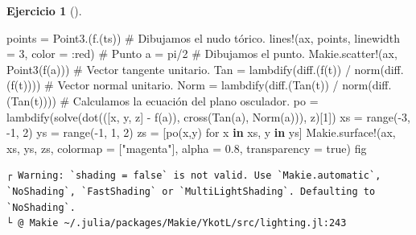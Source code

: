 \documentclass[
  a4paper,
]{scrreport}
\newenvironment{Shaded}{\begin{snugshade}}{\end{snugshade}}
\newcommand{\CommentTok}[1]{\textcolor[rgb]{0.37,0.37,0.37}{#1}}
\newcommand{\ConstantTok}[1]{\textcolor[rgb]{0.56,0.35,0.01}{#1}}
\newcommand{\FloatTok}[1]{\textcolor[rgb]{0.68,0.00,0.00}{#1}}
\newcommand{\FunctionTok}[1]{\textcolor[rgb]{0.28,0.35,0.67}{#1}}
\newcommand{\KeywordTok}[1]{\textcolor[rgb]{0.00,0.23,0.31}{\textbf{#1}}}
\newcommand{\NormalTok}[1]{\textcolor[rgb]{0.00,0.23,0.31}{#1}}
\newcommand{\OperatorTok}[1]{\textcolor[rgb]{0.37,0.37,0.37}{#1}}
\newcommand{\StringTok}[1]{\textcolor[rgb]{0.13,0.47,0.30}{#1}}
\theoremstyle{definition}
\newtheorem{exercise}{Ejercicio}[chapter]
\theoremstyle{remark}
\begin{document}
\begin{exercise}[]
\begin{tcolorbox}
\begin{Shaded}
\begin{Highlighting}[]
\NormalTok{points }\OperatorTok{=} \FunctionTok{Point3}\NormalTok{.(}\FunctionTok{f}\NormalTok{.(ts))}
\CommentTok{\# Dibujamos el nudo tórico.}
\FunctionTok{lines!}\NormalTok{(ax, points, linewidth }\OperatorTok{=} \FloatTok{3}\NormalTok{, color }\OperatorTok{=} \OperatorTok{:}\NormalTok{red)}
\CommentTok{\# Punto}
\NormalTok{a }\OperatorTok{=} \ConstantTok{pi}\OperatorTok{/}\FloatTok{2}
\CommentTok{\# Dibujamos el punto.}
\NormalTok{Makie.}\FunctionTok{scatter!}\NormalTok{(ax, }\FunctionTok{Point3}\NormalTok{(}\FunctionTok{f}\NormalTok{(a)))}
\CommentTok{\# Vector tangente unitario.}
\NormalTok{Tan }\OperatorTok{=} \FunctionTok{lambdify}\NormalTok{(}\FunctionTok{diff}\NormalTok{.(}\FunctionTok{f}\NormalTok{(t)) }\OperatorTok{/} \FunctionTok{norm}\NormalTok{(}\FunctionTok{diff}\NormalTok{.(}\FunctionTok{f}\NormalTok{(t))))}
\CommentTok{\# Vector normal unitario.}
\NormalTok{Norm }\OperatorTok{=} \FunctionTok{lambdify}\NormalTok{(}\FunctionTok{diff}\NormalTok{.(}\FunctionTok{Tan}\NormalTok{(t)) }\OperatorTok{/} \FunctionTok{norm}\NormalTok{(}\FunctionTok{diff}\NormalTok{.(}\FunctionTok{Tan}\NormalTok{(t))))}
\CommentTok{\# Calculamos la ecuación del plano osculador.}
\NormalTok{po }\OperatorTok{=} \FunctionTok{lambdify}\NormalTok{(}\FunctionTok{solve}\NormalTok{(}\FunctionTok{dot}\NormalTok{(([x, y, z] }\OperatorTok{{-}} \FunctionTok{f}\NormalTok{(a)), }\FunctionTok{cross}\NormalTok{(}\FunctionTok{Tan}\NormalTok{(a), }\FunctionTok{Norm}\NormalTok{(a))), z)[}\FloatTok{1}\NormalTok{])}
\NormalTok{xs }\OperatorTok{=} \FunctionTok{range}\NormalTok{(}\OperatorTok{{-}}\FloatTok{3}\NormalTok{, }\OperatorTok{{-}}\FloatTok{1}\NormalTok{, }\FloatTok{2}\NormalTok{)}
\NormalTok{ys }\OperatorTok{=} \FunctionTok{range}\NormalTok{(}\OperatorTok{{-}}\FloatTok{1}\NormalTok{, }\FloatTok{1}\NormalTok{, }\FloatTok{2}\NormalTok{)}
\NormalTok{zs }\OperatorTok{=}\NormalTok{ [}\FunctionTok{po}\NormalTok{(x,y) for x }\KeywordTok{in}\NormalTok{ xs, y }\KeywordTok{in}\NormalTok{ ys]}
\NormalTok{Makie.}\FunctionTok{surface!}\NormalTok{(ax, xs, ys, zs, colormap }\OperatorTok{=}\NormalTok{ [}\StringTok{"magenta"}\NormalTok{], alpha }\OperatorTok{=} \FloatTok{0.8}\NormalTok{, transparency }\OperatorTok{=} \ConstantTok{true}\NormalTok{)}
\NormalTok{fig}
\end{Highlighting}
\end{Shaded}

\begin{verbatim}
┌ Warning: `shading = false` is not valid. Use `Makie.automatic`, `NoShading`, `FastShading` or `MultiLightShading`. Defaulting to `NoShading`.
└ @ Makie ~/.julia/packages/Makie/YkotL/src/lighting.jl:243
\end{verbatim}


\end{tcolorbox}
\end{exercise}
\end{document}
